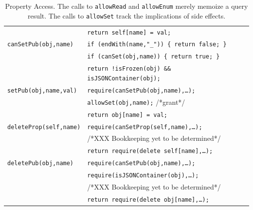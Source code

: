 \documentclass[letterpaper,twocolumn,10pt]{article}
\newcommand{\code}[1]{{\tt {#1}}}              %
\begin{document}
\begin{table}
\begin{tabular}{ll}
       & \code{return self[name] = val;} \\
  \code{canSetPub(obj,name)}
       & \code{if (endWith(name,"\_"))\ \{ return false; \}} \\
       & \code{if (canSet(obj,name))\ \{ return true; \}} \\
       & \code{return !isFrozen(obj) \&\& isJSONContainer(obj);} \\
  \code{setPub(obj,name,val)}
       & \code{require(canSetPub(obj,name),\ldots);} \\
       & \code{allowSet(obj,name);} /*grant*/ \\
       & \code{return obj[name] = val;} \\
  \hline               
  \code{deleteProp(self,name)} 
       & \code{require(canSetProp(self,name),\ldots);} \\
       & /*XXX Bookkeeping yet to be determined*/ \\
       & \code{return require(delete self[name],\ldots);} \\
  \code{deletePub(obj,name)} 
       & \code{require(canSetPub(obj,name),\ldots);} \\
       & \code{require(isJSONContainer(obj),\ldots);} \\
       & /*XXX Bookkeeping yet to be determined*/ \\
       & \code{return require(delete obj[name],\ldots);}
\end{tabular}

\caption[Property Access.]{Property Access. The calls to \code{allowRead} and
\code{allowEnum} merely memoize a query result. The calls to \code{allowSet}
track the implications of side effects.}
\label{tab:prop-access}
\end{table}
\end{document}
